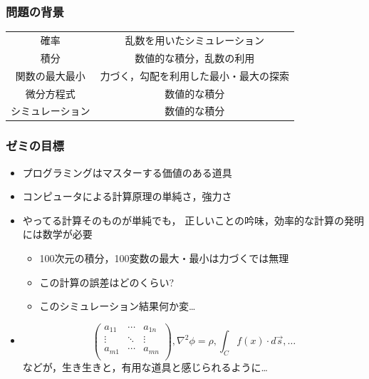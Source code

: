 \documentclass[12pt,dvipdfmx]{beamer}
\begin{document}
\begin{frame}
\frametitle{問題の背景}
\begin{tabular}{|c|c|}\hline
確率 & 乱数を用いたシミュレーション \\
積分 & 数値的な積分，乱数の利用 \\
関数の最大最小 & 力づく，勾配を利用した最小・最大の探索 \\
微分方程式 & 数値的な積分 \\
シミュレーション & 数値的な積分 \\\hline
\end{tabular}
\end{frame}


\begin{frame}
\frametitle{ゼミの目標}
\begin{itemize}
\item プログラミングはマスターする価値のある道具
\item コンピュータによる計算原理の単純さ，強力さ
\item やってる計算そのものが単純でも，
正しいことの吟味，効率的な計算の発明には数学が必要
\begin{itemize}
\item 100次元の積分，100変数の最大・最小は力づくでは無理
\item この計算の誤差はどのくらい?
\item このシミュレーション結果何か変\ldots
\end{itemize}

\item 
\[
\left(
\begin{array}{ccc}
a_{11}    & \cdots & a_{1n}    \\
\vdots   & \ddots & \vdots \\
a_{m1}    & \cdots & a_{mn}    \\
\end{array}
\right), 
\nabla^2 \phi = \rho, 
\int_C f(x) \cdot d\vec{s}, 
\ldots
\]
などが，生き生きと，有用な道具と感じられるように\ldots
\end{itemize}
\end{frame}
\end{document}
